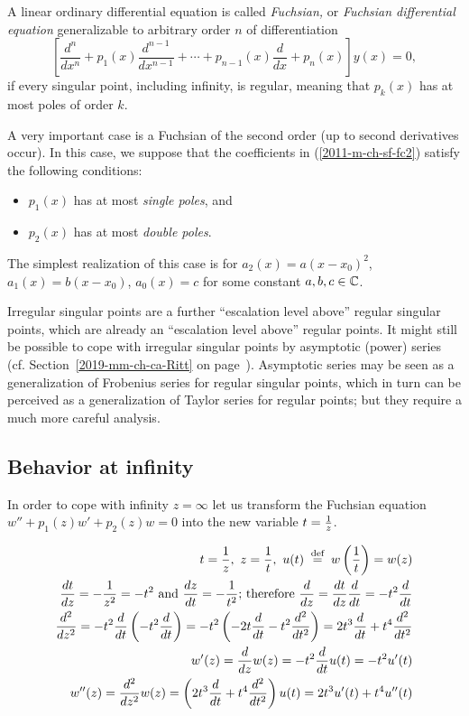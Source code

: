 A linear ordinary differential equation is called {\em Fuchsian,}
or {\em Fuchsian differential equation}
generalizable to arbitrary order $n$ of differentiation
\begin{equation}
\left[ \frac{d^n}{dx^n} + p_1  (x) \frac{d^{n-1}}{dx^{n-1}} + \cdots  + p_{n-1}  (x)  \frac{d}{dx}+    p_n  (x) \right]
y(x)
 =
0,
\label{2011-m-ch-sf-fc2gc}
\end{equation}
if every singular point, including infinity,
is regular, meaning that  $p_k (x)$ has at most poles of order $k$.


A  very important case is a Fuchsian of the second order
(up to second derivatives occur).
In this case,
we suppose that the coefficients in (\ref{2011-m-ch-sf-fc2})
satisfy the following conditions:
\begin{itemize}
\item
$p_1  (x)$ has at most {\em single poles}, and
\item
$p_2 (x)$ has at most  {\em double poles}.
\end{itemize}

The simplest realization of this case is for
$
a_2(x)= a(x-x_0)^2
$,
$
a_1(x)= b(x-x_0)
$,
$
a_0(x)= c
$
for some constant $a,b,c \in {\Bbb C}$.

Irregular singular points are a further ``escalation level above''
regular singular points, which are already an ``escalation level above'' regular points.
It might still be possible to cope with irregular singular points
by asymptotic (power) series
(cf. Section~\ref{2019-mm-ch-ca-Ritt} on page~\pageref{2019-mm-ch-ca-Ritt}).
Asymptotic series may be seen as a generalization of Frobenius series
 for regular singular points,
which in turn can be perceived as a generalization of Taylor series for regular points;
but they require a much more careful analysis.\cite{Bender-Orszag}


\subsection{Behavior at infinity}
\label{2012-m-ch-feainfty}
In order to cope with infinity $z=\infty$
let us transform the Fuchsian equation $w'' +p_1(z)w' +p_2(z)w=0$
into the new variable $t={1\over z}$.

\begin{equation}
\begin{split}
t={1\over z},\ z={1\over t},\ u(t)\stackrel{{\tiny \textrm{ def }}}
=
w\left({1\over t}\right)=w(z)
\\
{dt\over dz}=-{1\over z^2}=-t^2\text{ and }
{dz\over dt}=-{1\over t^2}
\textrm{; therefore }
{d\over dz}
=   {dt\over dz} {d\over dt} =
-t^2{d\over dt}
\\
{d^2\over dz^2}=-t^2{d\over dt}\left(-t^2{d\over dt}\right)=
-t^2\left(-2t{d\over dt}-t^2{d^2\over dt^2}\right)=
2t^3{d\over dt}+t^4{d^2\over dt^2}
\\
w'(z)={d\over dz}w(z)=-t^2{d\over dt}u(t)=
-t^2u'(t)
\\
w''(z)={d^2\over dz^2}w(z)=
\left(2t^3{d\over dt}+t^4
{d^2\over dt^2}\right)u(t)=2t^3u'(t)+t^4u''(t)
\end{split}
\end{equation}

